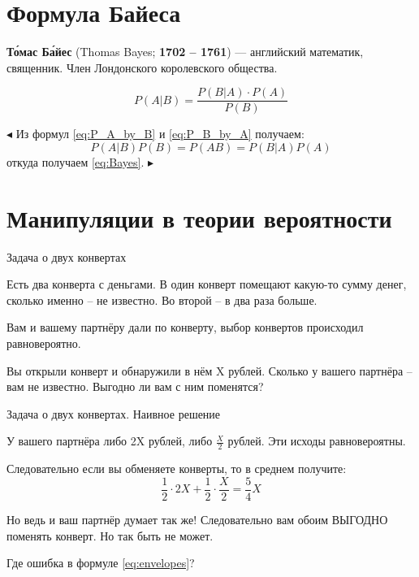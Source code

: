 \section{Формула Байеса}\label{section:Bayes}

\begin{frame}
\textbf{То́мас Ба́йес}
(Thomas Bayes; \textbf{1702 -- 1761}) 
— английский математик, священник. 
Член Лондонского королевского общества.
	
\begin{equation}\label{eq:Bayes}
P(A|B) = \frac{P(B|A) \cdot P(A)}{P(B)}
\end{equation}

$\blacktriangleleft$
Из формул \eqref{eq:P_A_by_B} и \eqref{eq:P_B_by_A}
получаем:
\begin{equation*}
P(A|B)P(B) = P(AB) = P(B|A) P(A)
\end{equation*}
откуда получаем \eqref{eq:Bayes}.
$\blacktriangleright$


\end{frame}




\section{Манипуляции в теории вероятности}\label{section:manipulations}
\begin{frame}{Задача о двух конвертах}

Есть два конверта с деньгами.
В один конверт помещают какую-то сумму денег,
сколько именно -- не известно. 
Во второй -- в два раза больше.

Вам и вашему партнёру дали по конверту, 
выбор конвертов происходил равновероятно.

Вы открыли конверт и обнаружили в нём X рублей.
Сколько у вашего партнёра -- вам не известно.
Выгодно ли вам с ним поменятся?


\end{frame}

\begin{frame}{Задача о двух конвертах. Наивное решение}

У вашего партнёра либо 2X рублей, либо
$\frac{X}{2}$ рублей. Эти исходы равновероятны.

Следовательно если вы обменяете конверты, то в среднем получите:
\begin{equation}\label{eq:envelopes}
	\frac{1}{2}\cdot2X + \frac{1}{2}\cdot\frac{X}{2}=\frac{5}{4}X	
\end{equation}

Но ведь и ваш партнёр думает так же! 
Следовательно вам обоим ВЫГОДНО поменять конверт.
Но так быть не может.

Где ошибка в формуле \eqref{eq:envelopes}?
\end{frame}

